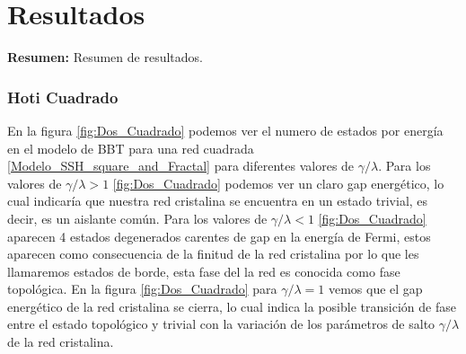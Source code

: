 \chapter{Resultados}

\begin{center}
\begin{minipage}{0.9\textwidth}
{\small
{\bf Resumen:} Resumen de resultados.
}
\end{minipage}
\end{center}



\subsection{Hoti Cuadrado}

En la figura \ref{fig:Dos_Cuadrado} podemos ver el numero de estados por energía en el modelo de BBT para una red cuadrada \ref{Modelo_SSH_square_and_Fractal} para diferentes valores de $\gamma/\lambda$. Para los valores de $\gamma/\lambda>1$ \ref{fig:Dos_Cuadrado}  podemos ver un claro gap energético, lo cual indicaría que nuestra red cristalina se encuentra en un estado trivial, es decir, es un aislante común. Para los valores de $\gamma/\lambda<1$ \ref{fig:Dos_Cuadrado}  aparecen 4 estados degenerados carentes de gap en la energía de Fermi, estos aparecen como consecuencia de la finitud de la red cristalina por lo que les llamaremos estados de borde, esta fase del la red es conocida como fase topológica. En la figura \ref{fig:Dos_Cuadrado} para   $\gamma/\lambda = 1$ vemos que el gap energético de la red cristalina se cierra, lo cual indica la posible transición de fase entre el estado topológico y trivial con la variación de los parámetros de salto $\gamma/\lambda$ de la red cristalina.






